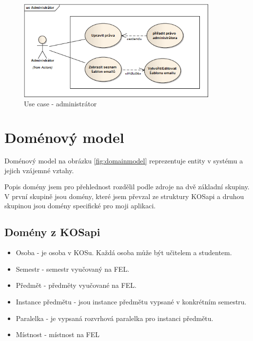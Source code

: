 \begin{figure}[H]
\begin{center}
\includegraphics[width=10cm]{figures/actor_root}
\caption{Use case - administrátor}
\label{fig:actor_root}
\end{center}
\end{figure}

\newpage 
\section{Doménový model}
Doménový model na obrázku \ref{fig:domainmodel} reprezentuje entity v systému a jejich vzájemné vztahy. 

Popis domény jsem pro přehlednost rozdělil podle zdroje na dvě základní skupiny. V první skupině jsou domény, které jsem převzal ze struktury KOSapi a druhou skupinou jsou domény specifické pro moji aplikaci. 

\label{sec:domeny_kosapi} 
\subsection{Domény z KOSapi}
\begin{itemize}
\item Osoba - je osoba v KOSu. Každá osoba může být učitelem a studentem.
\item Semestr - semestr vyučovaný na FEL. 
\item Předmět - předměty vyučované na FEL.
\item Instance předmětu - jsou instance předmětu vypsané v konkrétním semestru.
\item Paralelka - je vypsaná rozvrhová paralelka pro instanci předmětu.
\item Místnost - místnost na FEL
\end{itemize}

